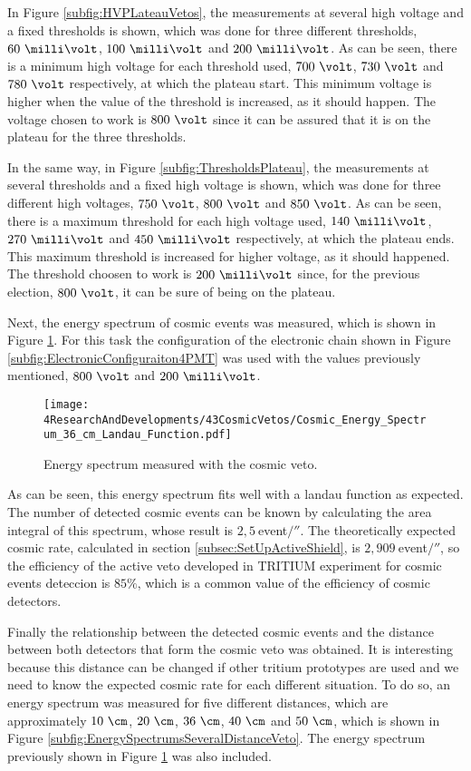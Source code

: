 In Figure \ref{subfig:HVPLateauVetos}, the measurements at several high voltage and a fixed thresholds is shown, which was done for three different thresholds, $60~\milli\volt$, $100~\milli\volt$ and $200~\milli\volt$. As can be seen, there is a minimum high voltage for each threshold used, $700~\volt$, $730~\volt$ and $780~\volt$ respectively, at which the plateau start. This minimum voltage is higher when the value of the threshold is increased, as it should happen. The voltage chosen to work is $800~\volt$ since it can be assured that it is on the plateau for the three thresholds.

In the same way, in Figure \ref{subfig:ThresholdsPlateau}, the measurements at several thresholds and a fixed high voltage is shown, which was done for three different high voltages, $750~\volt$, $800~\volt$ and $850~\volt$. As can be seen, there is a maximum threshold for each high voltage used,  $140~\milli\volt$, $270~\milli\volt$ and $450~\milli\volt$ respectively, at which the plateau ends. This maximum threshold is increased for higher voltage, as it should happened. The threshold choosen to work is $200~\milli\volt$ since, for the previous election, $800~\volt$, it can be sure of being on the plateau. 

Next, the energy spectrum of cosmic events was measured, which is shown in Figure \ref{fig:EnergySpectrumCosmicVeto}. For this task the configuration of the electronic chain shown in Figure \ref{subfig:ElectronicConfiguraiton4PMT} was used with the values previously mentioned, $800~\volt$ and $200~\milli\volt$. 

\begin{figure}[h]
\centering
\texttt{[image: 4ResearchAndDevelopments/43CosmicVetos/Cosmic\_Energy\_Spectrum\_36\_cm\_Landau\_Function.pdf]}
\caption{Energy spectrum measured with the cosmic veto.\label{fig:EnergySpectrumCosmicVeto}}
\end{figure}

As can be seen, this energy spectrum fits well with a landau function as expected. The number of detected cosmic events can be known by calculating the area integral of this spectrum, whose result is $2,5~$event$/\second$. The theoretically expected cosmic rate, calculated in section \ref{subsec:SetUpActiveShield}, is $2,909~$event$/\second$, so the efficiency of the active veto developed in TRITIUM experiment for cosmic events deteccion is $85\%$, which is a common value of the efficiency of cosmic detectors.

Finally the relationship between the detected cosmic events and the distance between both detectors that form the cosmic veto was obtained. It is interesting because this distance can be changed if other tritium prototypes are used and we need to know the expected cosmic rate for each different situation. To do so, an energy spectrum was measured for five different distances, which are approximately $10~\cm$, $20~\cm$, $36~\cm$, $40~\cm$ and $50~\cm$, which is shown in Figure \ref{subfig:EnergySpectrumsSeveralDistanceVeto}. The energy spectrum previously shown in Figure \ref{fig:EnergySpectrumCosmicVeto} was also included. 

